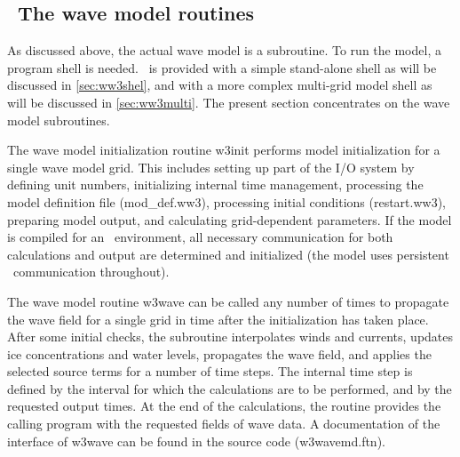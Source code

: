 \vssub
\subsection{~The wave model routines} \label{sec:core}
\vssub

As discussed above, the actual wave model is a subroutine. To run the model, a
program shell is needed. \ws\ is provided with a simple stand-alone shell as
will be discussed in \para\ref{sec:ww3shel}, and with a more complex
multi-grid model shell as will be discussed in \para\ref{sec:ww3multi}. The
present section concentrates on the wave model subroutines.

The wave model initialization routine {\F w3init} performs model
initialization for a single wave model grid. This includes setting up part of
the I/O system by defining unit numbers, initializing internal time
management, processing the model definition file ({\file mod\_def.ww3}),
processing initial conditions ({\file restart.ww3}), preparing model output,
and calculating grid-dependent parameters. If the model is compiled for an
\mpi\ environment, all necessary communication for both calculations and
output are determined and initialized (the model uses persistent \mpi\
communication throughout).

The wave model routine {\F w3wave} can be called any number of times to
propagate the wave field for a single grid in time after the initialization
has taken place. After some initial checks, the subroutine interpolates winds
and currents, updates ice concentrations and water levels, propagates the wave
field, and applies the selected source terms for a number of time steps. The
internal time step is defined by the interval for which the calculations are
to be performed, and by the requested output times. At the end of the
calculations, the routine provides the calling program with the requested
fields of wave data. A documentation of the interface of {\F w3wave} can be
found in the source code ({\file w3wavemd.ftn}).

 

